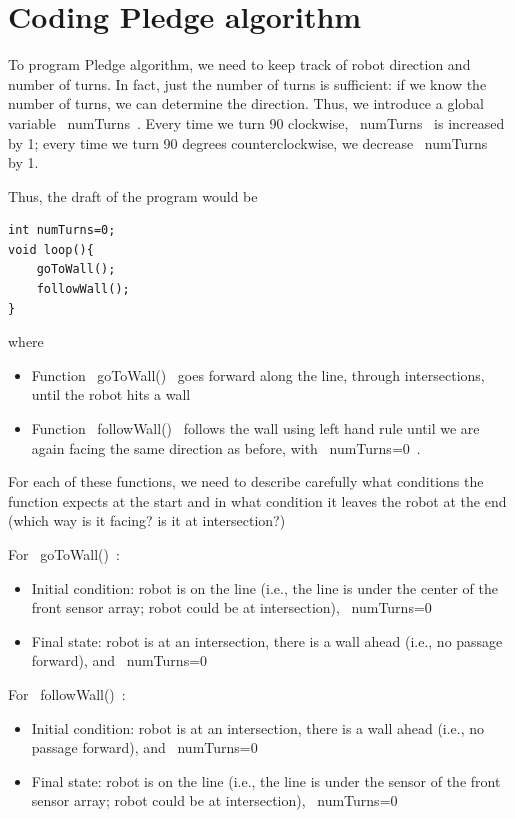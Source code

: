 \documentclass[oneside]{stml-l}
\numberwithin{figure}{chapter}
\begin{document}
\section{Coding Pledge algorithm}
To program Pledge algorithm, we need to keep track of robot direction
and number of turns. In fact, just the number of turns is sufficient: if we 
know the number of turns, we can determine the direction. Thus, we introduce 
a global variable ~numTurns~. Every time we turn 90 clockwise, ~numTurns~ 
is increased by 1;  every time we turn 90 degrees counterclockwise, we decrease 
~numTurns~ by  1. 

Thus, the draft of the program would be 
\begin{lstlisting}
int numTurns=0;
void loop(){
    goToWall();
    followWall();    
}
\end{lstlisting}
where
\begin{itemize}
\item Function ~goToWall()~ goes forward along the line, through 
intersections, until the robot hits a wall
\item Function ~followWall()~ follows the wall using left hand rule 
until we are again facing the same direction as before, with ~numTurns=0~.
\end{itemize}

For each of  these functions, we need to describe carefully what 
conditions the function expects at the start and in what condition 
it leaves the robot at the end (which way is it facing? is it at intersection?)

For ~goToWall()~:

\begin{itemize}
\item Initial condition: robot is on the line (i.e., the line is under the 
center of the front sensor array; robot could be at intersection), ~numTurns=0~
\item Final state: robot is at an intersection, there is a wall ahead 
(i.e., no passage forward), and  ~numTurns=0~
\end{itemize}

For ~followWall()~:
\begin{itemize}
\item Initial condition: robot is at an intersection, there is a wall ahead 
(i.e., no passage forward), and  ~numTurns=0~
\item Final state: robot is on the line (i.e., the line is under the 
sensor of the front sensor array; robot could be at intersection), ~numTurns=0~
\end{itemize}
\end{document}
